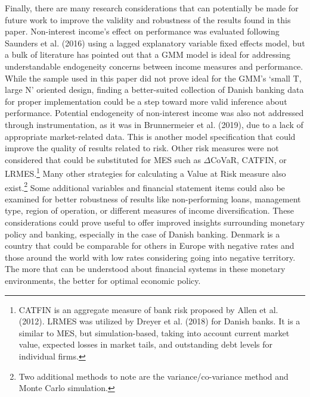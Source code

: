 \documentclass[10pt]{article} %
\begin{document}
Finally, there are many research considerations that can potentially be made for future work to improve the validity and robustness of the results found in this paper. Non-interest income's effect on performance was evaluated following Saunders et al. (2016) using a lagged explanatory variable fixed effects model, but a bulk of literature has pointed out that a GMM model is ideal for addressing understandable endogeneity concerns between income measures and performance. While the sample used in this paper did not prove ideal for the GMM's `small T, large N' oriented design, finding a better-suited collection of Danish banking data for proper implementation could be a step toward more valid inference about performance. Potential endogeneity of non-interest income was also not addressed through instrumentation, as it was in Brunnermeier et al. (2019), due to a lack of appropriate market-related data. This is another model specification that could improve the quality of results related to risk. Other risk measures were not considered that could be substituted for MES such as $\Delta$CoVaR, CATFIN, or LRMES.\footnote{CATFIN is an aggregate measure of bank risk proposed by Allen et al. (2012). LRMES was utilized by Dreyer et al. (2018) for Danish banks. It is a similar to MES, but simulation-based, taking into account current market value, expected losses in market tails, and outstanding debt levels for individual firms.} Many other strategies for calculating a Value at Risk measure also exist.\footnote{Two additional methods to note are the variance/co-variance method and Monte Carlo simulation.} Some additional variables and financial statement items could also be examined for better robustness of results like non-performing loans, management type, region of operation, or different measures of income diversification. These considerations could prove useful to offer improved insights surrounding monetary policy and banking, especially in the case of Danish banking. Denmark is a country that could be comparable for others in Europe with negative rates and those around the world with low rates considering going into negative territory. The more that can be understood about financial systems in these monetary environments, the better for optimal economic policy. 
\end{document}
